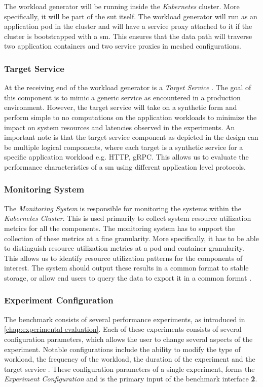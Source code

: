 The workload generator will be running inside the \textit{Kubernetes} cluster. More specifically, it will be part of the \gls{sut} itself. The workload generator will run as an application \gls{pod} in the cluster and will have a service proxy attached to it if the cluster is bootstrapped with a \gls{sm}. This ensures that the data path will traverse two application containers and two service proxies in meshed configurations.

\subsubsection{Target Service}
At the receiving end of the workload generator is a \textit{Target Service} . The goal of this component is to mimic a generic service as encountered in a production environment. However, the target service will take on a synthetic form and perform simple to no computations on the application workloads to minimize the impact on system resources and latencies observed in the experiments. An important note is that the target service component as depicted in the design can be multiple logical components, where each target is a synthetic service for a specific application workload e.g. HTTP, gRPC. This allows us to evaluate the performance characteristics of a \gls{sm} using different application level protocols.

\subsubsection{Monitoring System}
The \textit{Monitoring System}  is responsible for monitoring the systems within the \textit{Kubernetes Cluster}. This is used primarily to collect system resource utilization metrics for all the components. The monitoring system has to support the collection of these metrics at a fine granularity. More specifically, it has to be able to distinguish resource utilization metrics at a pod and container granularity. This allows us to identify resource utilization patterns for the components of interest. The system should output these results in a common format to stable storage, or allow end users to query the data to export it in a common format .


\subsubsection{Experiment Configuration}
The benchmark consists of several performance experiments, as introduced in \cref{chap:experimental-evaluation}. Each of these experiments consists of several configuration parameters, which allows the user to change several aspects of the experiment. Notable configurations include the ability to modify the type of workload, the frequency of the workload, the duration of the experiment and the target service . These configuration parameters of a single experiment, forms the \textit{Experiment Configuration}  and is the primary input of the benchmark interface \textbf{2}.

